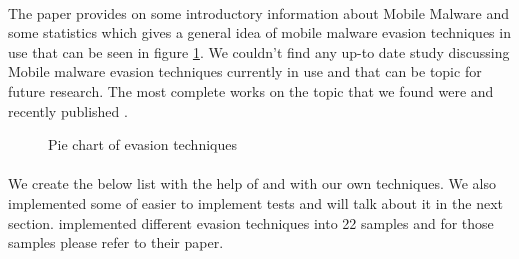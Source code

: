 \documentclass[../main.tex]{subfile}
\begin{document}
	\paragraph{} The paper \cite{amro2018malware} provides on some introductory information about Mobile Malware and some statistics which gives a general idea of mobile malware evasion techniques in use that can be seen in figure \ref{fig:pie_evasion}. We couldn't find any up-to date study discussing Mobile malware evasion techniques currently in use and that can be topic for future research. The most complete works on the topic that we found were \cite{vidas2014evading} and recently published \cite{ares}.
	
	\begin{figure}
		\centering
		\caption{Pie chart of evasion techniques \cite{amro2018malware}}
		\label{fig:pie_evasion}			
	\end{figure}
	
	
	\paragraph{} We create the below list with the help of \cite{vidas2014evading} \cite{sophos_anti_emulation} and with our own techniques. We also implemented some of easier to implement tests and will talk about it in the next section. \cite{ares} implemented different evasion techniques into 22 samples and for those samples please refer to their paper.
		
\end{document}
